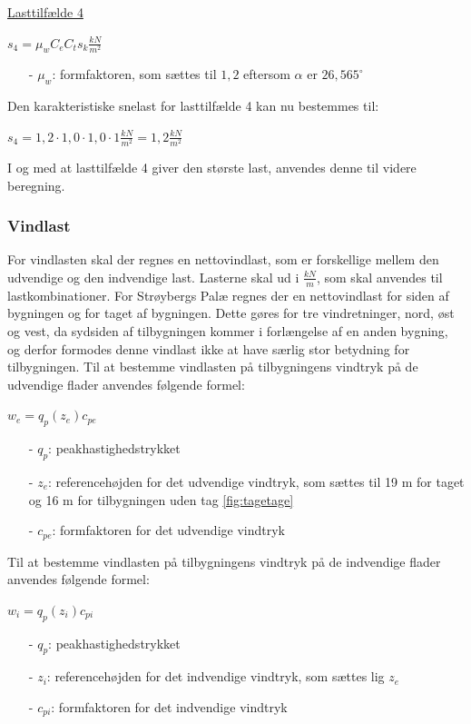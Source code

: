 \underline{Lasttilfælde 4}
\begin{center}
	$s_4=\mu_wC_eC_ts_k \frac{kN}{m^2}$
\end{center}
\begin{itemize}
	\item[-] $\mu_w$: formfaktoren, som sættes til $1,\!2$ eftersom $\alpha$ er $26,\!565^{\circ}$ \citep[ kapitel 5.3.3]{EU91}
\end{itemize}
Den karakteristiske snelast for lasttilfælde 4 kan nu bestemmes til:
\begin{center}
	$s_4=1,\!2\cdot 1,\!0\cdot 1,\!0\cdot 1 \frac{kN}{m^2}=1,\!2 \frac{kN}{m^2}$
\end{center}
I og med at lasttilfælde 4 giver den største last, anvendes denne til videre beregning.

\subsubsection{Vindlast}
For vindlasten skal der regnes en nettovindlast, som er forskellige mellem den udvendige og den indvendige last. Lasterne skal ud i $\frac{kN}{m}$, som skal anvendes til lastkombinationer.
\newline \indent{     }  For Strøybergs Palæ regnes der en nettovindlast for siden af bygningen og for taget af bygningen. Dette gøres for tre vindretninger, nord, øst og vest, da sydsiden af tilbygningen kommer i forlængelse af en anden bygning, og derfor formodes denne vindlast ikke at have særlig stor betydning for tilbygningen.
\newline
\newline
Til at bestemme vindlasten på tilbygningens vindtryk på de udvendige flader anvendes følgende formel:	
\begin{center} 
	$w_e=q_p(z_e)c_{pe}$
\end{center}
\begin{itemize}
	\item[-] $q_p$: peakhastighedstrykket
	\item[-] $z_e$: referencehøjden for det udvendige vindtryk, som sættes til 19 m for taget og 16 m for tilbygningen uden tag \ref{fig:tagetage}
	\item[-] $c_{pe}$: formfaktoren for det udvendige vindtryk
\end{itemize}

Til at bestemme vindlasten på tilbygningens vindtryk på de indvendige flader anvendes følgende formel:
\begin{center} 
	$w_i=q_p(z_i)c_{pi}$
\end{center}
\begin{itemize}
	\item[-] $q_p$: peakhastighedstrykket
	\item[-] $z_i$: referencehøjden for det indvendige vindtryk, som sættes lig $z_e$ \citep[ kapitel 7.2.9]{EU91}
	\item[-] $c_{pi}$: formfaktoren for det indvendige vindtryk
\end{itemize}

